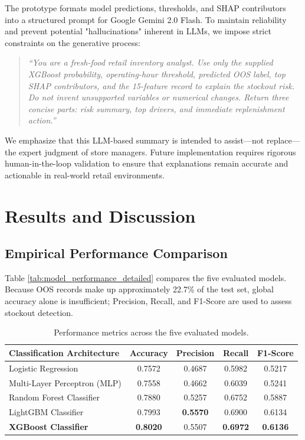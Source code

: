 \documentclass[11pt, a4paper]{article}
\begin{document}
The prototype formats model predictions, thresholds, and SHAP contributors into a structured prompt for Google Gemini 2.0 Flash. To maintain reliability and prevent potential "hallucinations" inherent in LLMs, we impose strict constraints on the generative process:
\begin{quote}
\textit{``You are a fresh-food retail inventory analyst. Use only the supplied XGBoost probability, operating-hour threshold, predicted OOS label, top SHAP contributors, and the 15-feature record to explain the stockout risk. Do not invent unsupported variables or numerical changes. Return three concise parts: risk summary, top drivers, and immediate replenishment action.''}
\end{quote}
We emphasize that this LLM-based summary is intended to assist—not replace—the expert judgment of store managers. Future implementation requires rigorous human-in-the-loop validation to ensure that explanations remain accurate and actionable in real-world retail environments.

\section{Results and Discussion}

\subsection{Empirical Performance Comparison}
Table \ref{tab:model_performance_detailed} compares the five evaluated models. Because OOS records make up approximately 22.7\% of the test set, global accuracy alone is insufficient; Precision, Recall, and F1-Score are used to assess stockout detection.

\begin{table}[htbp]
\centering
\caption{Performance metrics across the five evaluated models.}\label{tab:metrics}
\vspace{3pt}
\begin{tabular}{l c c c c}
\toprule
\textbf{Classification Architecture} & \textbf{Accuracy} & \textbf{Precision} & \textbf{Recall} & \textbf{F1-Score} \\
\midrule   
Logistic Regression          & 0.7572 & 0.4687 & 0.5982 & 0.5217 \\
Multi-Layer Perceptron (MLP) & 0.7558 & 0.4662 & 0.6039 & 0.5241 \\
Random Forest Classifier     & 0.7880 & 0.5257 & 0.6752 & 0.5887 \\
LightGBM Classifier          & 0.7993 & \textbf{0.5570} & 0.6900 & 0.6134 \\
\textbf{XGBoost Classifier}  & \textbf{0.8020} & 0.5507 & \textbf{0.6972} & \textbf{0.6136} \\
\bottomrule
\end{tabular}
\end{table}
\end{document}
